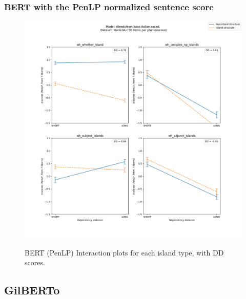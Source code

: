 \subsubsection{BERT with the PenLP normalized sentence score}
\begin{figure}[h]
	\centering
	\includegraphics[width=1\textwidth]{images/AppendixA/Madeddu_wh_dbmdz_bert-base-italian-cased_PenLP-zscores-likert-2022-09-17_h11m09s51.png} 
	\label{A-fig:md_bert2b_penlp}
	\caption{BERT (PenLP) Interaction plots for each island type, with DD scores.}
\end{figure}

\clearpage
\subsection{GilBERTo}
